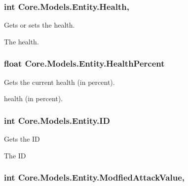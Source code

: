 \subsubsection[{Health}]{\setlength{\rightskip}{0pt plus 5cm}int Core.\+Models.\+Entity.\+Health\hspace{0.3cm}{\ttfamily [get]}, {\ttfamily [set]}}\label{classCore_1_1Models_1_1Entity_ac054f7e992fe65ae3ffa998e4d4d1225}


Gets or sets the health. 

The health.\hypertarget{classCore_1_1Models_1_1Entity_a05336fa3c927b9f1c299f55ec27a6e0c}{}
\subsubsection[{Health\+Percent}]{\setlength{\rightskip}{0pt plus 5cm}float Core.\+Models.\+Entity.\+Health\+Percent\hspace{0.3cm}{\ttfamily [get]}}\label{classCore_1_1Models_1_1Entity_a05336fa3c927b9f1c299f55ec27a6e0c}


Gets the current health (in percent). 

health (in percent).\hypertarget{classCore_1_1Models_1_1Entity_aa7b2cae79fc1801861c7cd20e273e3fd}{}
\subsubsection[{I\+D}]{\setlength{\rightskip}{0pt plus 5cm}int Core.\+Models.\+Entity.\+I\+D\hspace{0.3cm}{\ttfamily [get]}}\label{classCore_1_1Models_1_1Entity_aa7b2cae79fc1801861c7cd20e273e3fd}


Gets the I\+D 

The I\+D\hypertarget{classCore_1_1Models_1_1Entity_a7480e9bdfa56f0a21e784bf5cadcf3cd}{}
\subsubsection[{Modfied\+Attack\+Value}]{\setlength{\rightskip}{0pt plus 5cm}int Core.\+Models.\+Entity.\+Modfied\+Attack\+Value\hspace{0.3cm}{\ttfamily [get]}, {\ttfamily [set]}}\label{classCore_1_1Models_1_1Entity_a7480e9bdfa56f0a21e784bf5cadcf3cd}


